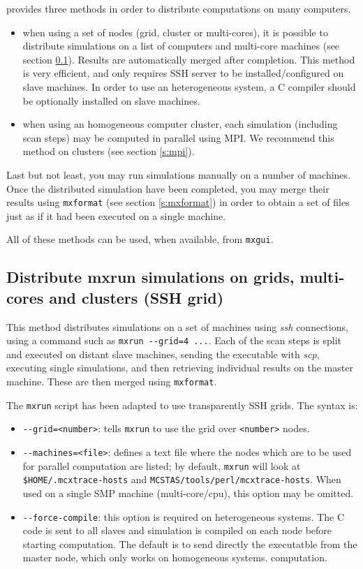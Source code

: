\MCX provides three methods in order to distribute computations on many computers.
\begin{itemize}
\item when using a set of nodes (grid, cluster or multi-cores), it is possible to distribute simulations on a 
  list of computers and multi-core machines (see section \ref{s:ssh-grid}). Results are automatically 
  merged after completion. 
  This method is very efficient, and only requires SSH server to be installed/configured on slave machines. 
  In order to use an heterogeneous system, a C compiler should be optionally installed on slave machines.
\item when using an homogeneous computer cluster, each simulation (including scan
  steps) may be computed in parallel using MPI. We recommend this method on clusters (see section \ref{s:mpi}).
\end{itemize}

Last but not least, you may run simulations manually on a number of machines.
Once the distributed simulation have been completed, you may merge their results using \verb+mxformat+ (see section \ref{s:mxformat})  in order to obtain a set of files just as if it had been executed on a single machine.

All of these methods can be used, when available, from \texttt{mxgui}.

\subsection{Distribute mxrun simulations on grids, multi-cores and clusters (SSH grid)}
\label{s:ssh-grid}
  This method distributes simulations on a set of machines using \emph{ssh}
  connections, using a command such as \verb+mxrun --grid=4 ...+. 
  Each of the scan steps is split and executed on distant slave machines, sending the executable
  with \emph{scp}, executing single simulations, and then retrieving individual
  results on the master machine. These are then merged using \texttt{mxformat}. 
  
  The \verb'mxrun' script has been adapted to use transparently SSH grids. The syntax is:
\begin{itemize}
\item \verb'--grid=<number>': tells \verb'mxrun' to use the grid over \verb'<number>' nodes.
\item \verb'--machines=<file>': defines a text file where the
  nodes which are to be used for parallel computation are listed; by
  default, \verb'mxrun' will look at \verb'$HOME/.mcxtrace-hosts' and
  \verb'MCSTAS/tools/perl/mcxtrace-hosts'. When used on a single SMP machine 
  (multi-core/cpu), this option may be omitted.
\item \verb'--force-compile': this option is required on heterogeneous systems. 
  The C code is sent to all slaves and simulation is compiled on each node before 
  starting computation. The default is to send directly the executatble from the 
  master node, which only works on homogeneous systems.
  computation. 
\end{itemize}
  
